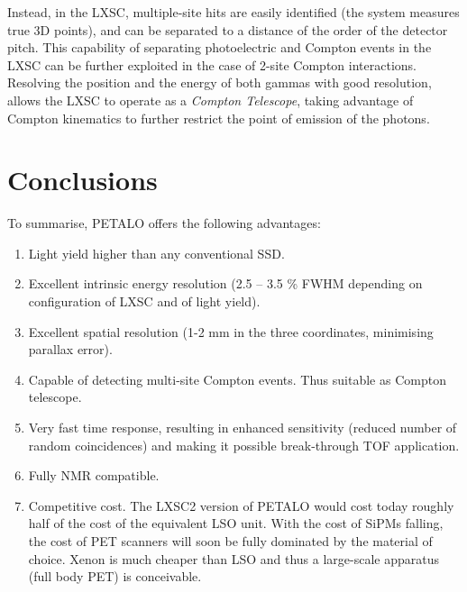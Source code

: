 \documentclass[a4paper,11pt,oneside]{article}
\begin{document}
Instead, in the LXSC, multiple-site hits are easily identified (the system measures true 3D points), and can be separated to a distance of the order of the detector pitch. This capability of separating photoelectric and Compton events in the LXSC can be further exploited in the case of 2-site Compton interactions. Resolving the position and the energy of both gammas with good resolution, allows the LXSC to operate as a {\em Compton Telescope}, taking advantage of Compton kinematics to further restrict the point of emission of the photons. 


\section{Conclusions}
\label{sec.conclu}

To summarise, PETALO offers the following advantages:
\begin{enumerate}
\item Light yield higher than any conventional SSD.
\item Excellent intrinsic energy resolution (2.5 -- 3.5 \% FWHM depending on configuration of LXSC and of light yield). 
\item Excellent spatial resolution (1-2 mm in the three coordinates, minimising parallax error).
\item Capable of detecting multi-site Compton events. Thus suitable as Compton telescope.
\item Very fast time response, resulting in enhanced sensitivity (reduced number of random coincidences) and making it possible break-through TOF application. 
\item Fully NMR compatible. 
\item Competitive cost. The LXSC2 version of PETALO would cost today roughly half of the cost of the equivalent LSO unit. With the cost of SiPMs falling, the  cost of PET scanners will soon be fully dominated by the material of choice. Xenon is much cheaper than LSO and thus a large-scale apparatus (full body PET) is conceivable. 
\end{enumerate}
\end{document}
